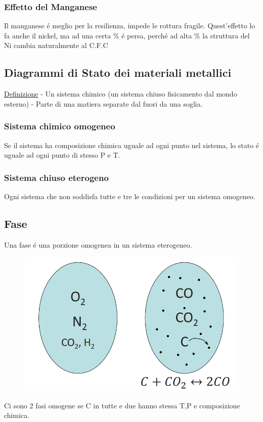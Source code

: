 \documentclass{article}
\begin{document}
{            \subsubsection{Effetto del Manganese}
                Il manganese \'e meglio per la resilienza, impede le rottura fragile. Quest'effetto lo fa anche il nickel, ma ad una certa $\%$ \'e persa, perch\'e ad alta $\%$ la struttura del Ni cambia naturalmente al C.F.C
        \subsection{Diagrammi di Stato dei materiali metallici}
            \underline{Definizione} - Un sistema chimico (un sistema chiuso fisicamento dal mondo esterno) - Parte di una matiera separate dal fuori da una soglia. \\
            \subsubsection{Sistema chimico omogeneo}
                Se il sistema ha composizione chimica uguale ad ogni punto nel sistema, lo stato \'e uguale ad ogni punto di stesso P e T.
            \subsubsection{Sistema chiuso eterogeno}
                Ogni sistema che non soddisfa tutte e tre le condizioni per un sistema omogeneo.
        \subsection{Fase}
            Una fase \'e una porzione omogenea in un sistema eterogeneo.
            \begin{figure}[!h]
                \centering
                \includegraphics[width=.85\linewidth]{Esempio delle fasi in un sistema chiuso dei composti.png}
            \end{figure}
            Ci sono 2 fasi omogene se C in tutte e due hanno stessa T,P e composizione chimica.
}
\end{document}
